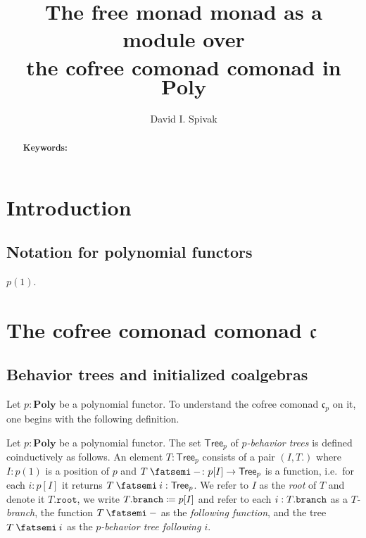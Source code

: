 \documentclass[11pt, one side, article]{memoir}
\theoremstyle{definition}
\theoremstyle{plain}
\newenvironment{definition}
  {\pushQED{\qed}\renewcommand{\qedsymbol}{$\lozenge$}\definitionx}
  {\popQED\enddefinitionx}
\newcommand{\Set}[1]{\mathsf{#1}}%
\newcommand{\Cat}[1]{\mathbf{#1}}%
\newcommand{\then}{\mathbin{\fatsemi}}
\newcommand{\tn}[1]{\textnormal{#1}}
\newcommand{\poly}{\Cat{Poly}}
\newcommand{\cofree}{\mathfrak{c}}
\newcommand{\tree}{\Set{Tree}}
\newcommand{\rt}{\texttt{root}}
\newcommand{\br}{\tn{\texttt{branch}}}
\begin{document}
\title{The free monad monad as a module over\\the cofree comonad comonad in $\poly$}

\author{David I. Spivak}

\date{\vspace{-.2in}}

\maketitle

\begin{abstract}


\smallskip

\noindent
\textbf{Keywords:} 
\end{abstract}


\chapter{Introduction}

\section{Notation for polynomial functors}

$p(1)$.

\chapter{The cofree comonad comonad $\cofree$}

\section{Behavior trees and initialized coalgebras}

Let $p:\poly$ be a polynomial functor. To understand the cofree comonad $\cofree_p$ on it, one begins with the following definition.

\begin{definition}
Let $p:\poly$ be a polynomial functor. The set $\tree_p$ of \emph{$p$-behavior trees} is defined coinductively as follows. An element $T:\tree_p$ consists of a pair $(I,T.)$ where $I:p(1)$ is a position of $p$ and $T\then -\colon p[I]\to\tree_p$ is a function, i.e.\ for each $i:p[I]$ it returns $T\then i:\tree_p$. 
We refer to $I$ as the \emph{root} of $T$ and denote it $T.\rt$, we write $T.\br\coloneqq p[I]$ and refer to each $i:T.\br$ as a \emph{$T$-branch}, the function $T\then-$ as the \emph{following function}, and the tree $T\then i$ as the \emph{$p$-behavior tree following $i$}.
\end{definition}
\end{document}
